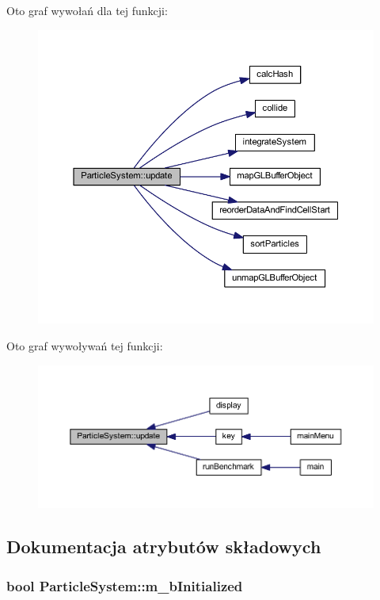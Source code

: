 Oto graf wywołań dla tej funkcji\-:\nopagebreak
\begin{figure}[H]
\begin{center}
\leavevmode
\includegraphics[width=350pt]{class_particle_system_a166fd86f020b6024d7d42723762d7cb2_cgraph}
\end{center}
\end{figure}




Oto graf wywoływań tej funkcji\-:\nopagebreak
\begin{figure}[H]
\begin{center}
\leavevmode
\includegraphics[width=350pt]{class_particle_system_a166fd86f020b6024d7d42723762d7cb2_icgraph}
\end{center}
\end{figure}




\subsection{Dokumentacja atrybutów składowych}
\hypertarget{class_particle_system_a21bbfba9d8701a70bc6fddbf4fc3f5bd}{
\subsubsection[{m\-\_\-b\-Initialized}]{\setlength{\rightskip}{0pt plus 5cm}bool Particle\-System\-::m\-\_\-b\-Initialized\hspace{0.3cm}{\ttfamily [protected]}}}\label{class_particle_system_a21bbfba9d8701a70bc6fddbf4fc3f5bd}


